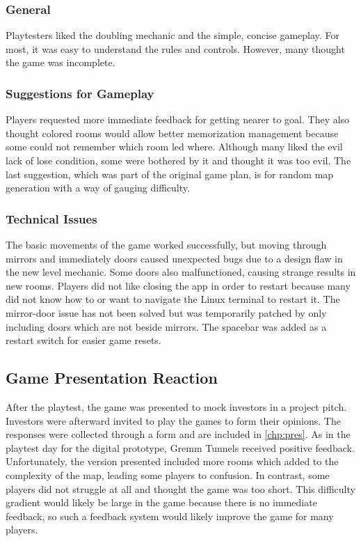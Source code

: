\documentclass{scrreprt}
\begin{document}
				\subsubsection{General}
					Playtesters liked the doubling mechanic and the simple, concise gameplay. For most, it was easy to understand the rules and controls. However, many thought the game was incomplete.
					
				\subsubsection{Suggestions for Gameplay}
					Players requested more immediate feedback for getting nearer to goal. They also thought colored rooms would allow better memorization management because some could not remember which room led where. Although many liked the evil lack of lose condition, some were bothered by it and thought it was too evil. The last suggestion, which was part of the original game plan, is for random map generation with a way of gauging difficulty.
				
				\subsubsection{Technical Issues}
					The basic movements of the game worked successfully, but moving through mirrors and immediately doors caused unexpected bugs due to a design flaw in the new level mechanic. Some doors also malfunctioned, causing strange results in new rooms. Players did not like closing the app in order to restart because many did not know how to or want to navigate the Linux terminal to restart it. The mirror-door issue has not been solved but was temporarily patched by only including doors which are not beside mirrors. The spacebar was added as a restart switch for easier game resets.
			
			\subsection{Game Presentation Reaction}
				After the playtest, the game was presented to mock investors in a project pitch. Investors were afterward invited to play the games to form their opinions. The responses were collected through a form and are included in \autoref{chp:pres}. As in the playtest day for the digital prototype, Gremm Tunnels received positive feedback. Unfortunately, the version presented included more rooms which added to the complexity of the map, leading some players to confusion. In contrast, some players did not struggle at all and thought the game was too short. This difficulty gradient would likely be large in the game because there is no immediate feedback, so such a feedback system would likely improve the game for many players.
				
\end{document}
